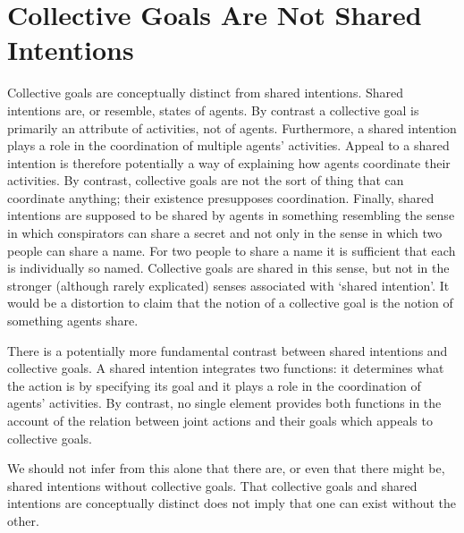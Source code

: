 \documentclass[12pt,a4paper]{extarticle}
\begin{document}
\section{Collective Goals Are Not Shared Intentions 
	\label{section_collective_vs_shared}
}
Collective goals are conceptually distinct from shared intentions.  
Shared intentions are, or resemble, states of agents.  By contrast a collective goal is primarily an attribute of activities, not of agents.  Furthermore, a shared intention plays a role in the coordination of multiple agents' activities.  Appeal to a shared intention is therefore potentially a way of explaining how agents coordinate their activities.  By contrast, collective goals are not the sort of thing that can coordinate anything; their existence presupposes coordination.  Finally, shared intentions are supposed to be shared by agents in something resembling the sense in which conspirators can share a secret and not only in the sense in which two people can share a name.  
For two people to share a name it is sufficient that each is individually  so named.  
Collective goals are shared in this sense, but not in the stronger (although rarely explicated) senses associated with `shared intention'.
It would be a distortion to claim that the notion of a collective goal is the notion of something agents share.

There is a potentially more fundamental contrast between shared intentions and collective goals.  A shared intention integrates two functions: it determines what the action is by specifying its goal and it plays a role in the coordination of agents' activities.  By contrast, no single element provides both functions in the account of the relation between joint actions and their goals which appeals to collective goals.  

We should not infer from this alone that there are, or even that there might be, shared intentions without collective goals.  That collective goals and shared intentions are conceptually distinct does not imply that one can exist without the other.
\end{document}
